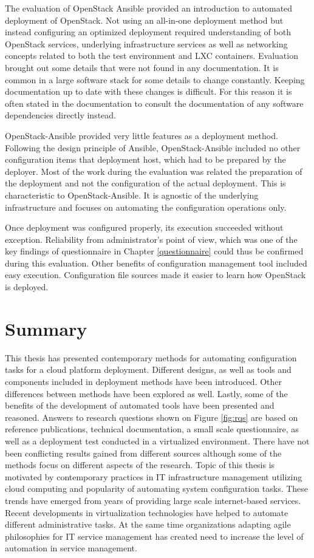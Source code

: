 The evaluation of OpenStack Ansible provided an introduction to automated
deployment of OpenStack. Not using an all-in-one deployment method but instead
configuring an optimized deployment required understanding of both OpenStack
services, underlying infrastructure services as well as networking concepts
related to both the test environment and LXC containers. Evaluation brought out
some details that were not found in any documentation. It is common in a large
software stack for some details to change constantly. Keeping documentation up
to date with these changes is difficult. For this reason it is often stated in
the documentation to consult the documentation of any software dependencies
directly instead.

OpenStack-Ansible provided very little features as a deployment method.
Following the design principle of Ansible, OpenStack-Ansible included no other
configuration items that deployment host, which had to be prepared by the
deployer. Most of the work during the evaluation was related the preparation of
the deployment and not the configuration of the actual deployment. This is
characteristic to OpenStack-Ansible. It is agnostic of the underlying
infrastructure and focuses on automating the configuration operations only.

Once deployment was configured properly, its execution succeeded without
exception. Reliability from administrator's point of view, which was one of the
key findings of questionnaire in Chapter \ref{questionnaire} could thus be
confirmed during this evaluation. Other benefits of configuration management
tool included easy execution. Configuration file sources made it easier to
learn how OpenStack is deployed.

\chapter{Summary}

This thesis has presented contemporary methods for automating configuration
tasks for a cloud platform deployment. Different designs, as well as tools and
components included in deployment methods have been introduced. Other
differences between methods have been explored as well. Lastly, some of the
benefits of the development of automated tools have been presented and
reasoned. Answers to research questions shown on Figure \ref{fig:rqs} are based
on reference publications, technical documentation, a small scale
questionnaire, as well as a deployment test conducted in a virtualized
environment. There have not been conflicting results gained from different
sources although some of the methods focus on different aspects of the
research. Topic of this thesis is motivated by contemporary practices in IT
infrastructure management utilizing cloud computing and popularity of
automating system configuration tasks. These trends have emerged from years of
providing large scale internet-based services. Recent developments in
virtualization technologies have helped to automate different administrative
tasks. At the same time organizations adapting agile philosophies for IT
service management has created need to increase the level of automation in
service management.

